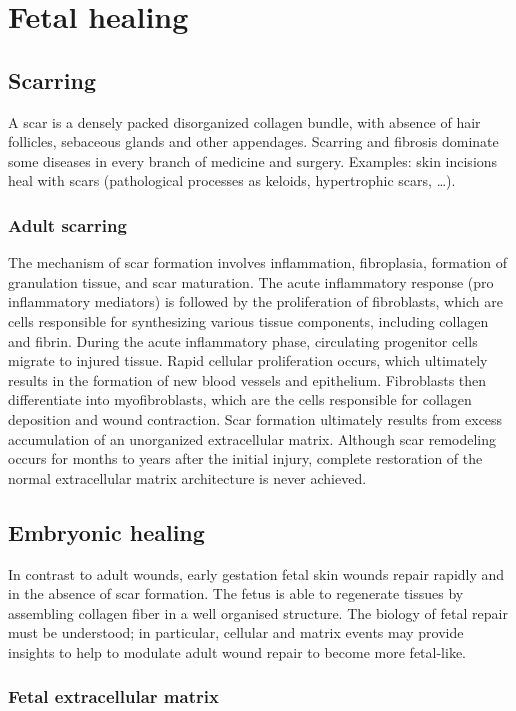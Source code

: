 \graphicspath{{chapters/07/images/}}
\chapter{Fetal healing}

\section{Scarring}
A scar is a densely packed disorganized collagen bundle, with absence of hair follicles, sebaceous glands and other appendages.
Scarring and fibrosis dominate some diseases in every branch of medicine and surgery.
Examples: skin incisions heal with scars (pathological processes as keloids, hypertrophic scars, …).

\subsection{Adult scarring}
The mechanism of scar formation involves inflammation, fibroplasia, formation of granulation tissue, and scar maturation.  The acute inflammatory response (pro inflammatory mediators) is followed by the proliferation of fibroblasts, which are cells responsible for synthesizing various tissue components, including collagen and fibrin. During the acute inflammatory phase, circulating progenitor cells migrate to injured tissue. Rapid cellular proliferation occurs, which ultimately results in the formation of new blood vessels and epithelium. Fibroblasts then differentiate into myofibroblasts, which are the cells responsible for collagen deposition and wound contraction. Scar formation ultimately results from excess accumulation of an unorganized extracellular matrix. Although scar remodeling occurs for months to years after the initial injury, complete restoration of the normal extracellular matrix architecture is never achieved.

\section{Embryonic healing}
In contrast to adult wounds, early gestation fetal skin wounds repair rapidly and in the absence of scar formation.
The fetus is able to regenerate tissues by assembling collagen fiber in a well organised structure.
The biology of fetal repair must be understood; in particular, cellular and matrix events may provide insights to help to modulate adult wound repair to become more fetal-like.

\subsection{Fetal extracellular matrix}

